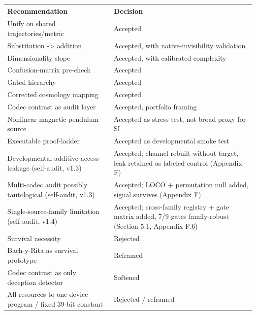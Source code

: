 \documentclass[
  11pt,
]{article}
\newcounter{none} %
\begin{document}
{\def\LTcaptype{none} %
\begin{longtable}[]{@{}
  >{\raggedright\arraybackslash}p{}
  >{\raggedright\arraybackslash}p{}@{}}
\toprule\noalign{}
\begin{minipage}[b]{\linewidth}\raggedright
Recommendation
\end{minipage} &
\begin{minipage}[b]{\linewidth}\raggedright
Decision
\end{minipage} \\
\midrule\noalign{}
\endhead
\bottomrule\noalign{}
\endlastfoot
Unify on shared trajectories/metric & Accepted \\
Substitution -\textgreater{} addition & Accepted, with
native-invisibility validation \\
Dimensionality slope & Accepted, with calibrated
complexity \\
Confusion-matrix pre-check & Accepted \\
Gated hierarchy & Accepted \\
Corrected cosmology mapping & Accepted \\
Codec contrast as audit layer & Accepted, portfolio
framing \\
Nonlinear magnetic-pendulum source & Accepted as stress
test, not broad proxy for SI \\
Executable proof-ladder & Accepted as developmental
smoke test \\
Developmental additive-access leakage (self-audit,
v1.3) & Accepted; channel rebuilt without target, leak
retained as labeled control (Appendix F) \\
Multi-codec audit possibly tautological (self-audit,
v1.3) & Accepted; LOCO + permutation null added, signal
survives (Appendix F) \\
Single-source-family limitation (self-audit, v1.4) &
Accepted; cross-family registry + gate matrix added,
7/9 gates family-robust (Section 5.1, Appendix F.6) \\
Survival necessity & Rejected \\
Bach-y-Rita as survival prototype & Reframed \\
Codec contrast as only deception detector & Softened \\
All resources to one device program / fixed 39-bit
constant & Rejected / reframed \\
\end{longtable}
}
\end{document}
